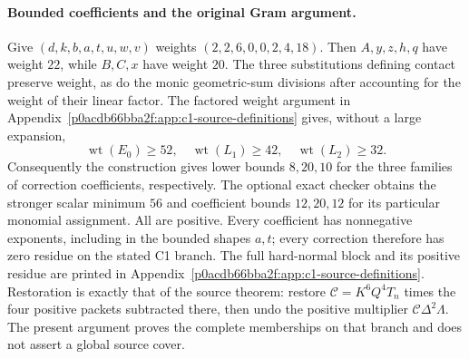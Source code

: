 \paragraph{Bounded coefficients and the original Gram argument.}
Give $(d,k,b,a,t,u,w,v)$ weights $(2,2,6,0,0,2,4,18)$.
Then $A,y,z,h,q$ have weight $22$, while $B,C,x$ have weight $20$.
The three substitutions defining contact preserve weight, as do the
monic geometric-sum divisions after accounting for the weight of their
linear factor. The factored weight argument in
Appendix~\ref{p0acdb66bba2f:app:c1-source-definitions} gives, without a large expansion,
\[
 \operatorname{wt}(E_0)\ge52,\quad
 \operatorname{wt}(L_1)\ge42,\quad
 \operatorname{wt}(L_2)\ge32.
\]
Consequently the construction gives lower bounds $8,20,10$ for the
three families of correction coefficients, respectively. The optional
exact checker obtains the stronger scalar minimum $56$ and coefficient
bounds $12,20,12$ for its particular monomial assignment.
All are positive. Every coefficient has nonnegative
exponents, including in the bounded shapes $a,t$; every correction
therefore has zero residue on the stated C1 branch. The full hard-normal
block and its positive residue are printed in
Appendix~\ref{p0acdb66bba2f:app:c1-source-definitions}. Restoration is exactly that of the source theorem: restore
$\mathcal C=K^6Q^4T_n$ times the four positive packets subtracted there,
then undo the positive multiplier $\mathcal C\Delta^2\Lambda$. The present argument proves the complete
memberships on that branch and does not assert a global source cover.
